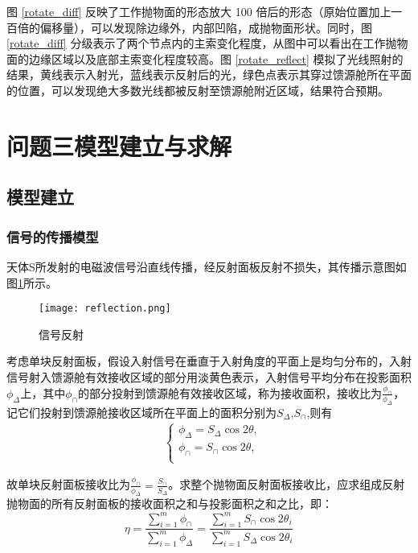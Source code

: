 \documentclass[withoutpreface,bwprint,fontset=macnew]{cumcmthesis} %
\begin{document}
		图 \ref{rotate_diff} 反映了工作抛物面的形态放大 100 倍后的形态（原始位置加上一百倍的偏移量），可以发现除边缘外，内部凹陷，成抛物面形状。同时，图 \ref{rotate_diff} 分级表示了两个节点内的主索变化程度，从图中可以看出在工作抛物面的边缘区域以及底部主索变化程度较高。图 \ref{rotate_reflect} 模拟了光线照射的结果，黄线表示入射光，蓝线表示反射后的光，绿色点表示其穿过馈源舱所在平面的位置，可以发现绝大多数光线都被反射至馈源舱附近区域，结果符合预期。
		
		
	\section {问题三模型建立与求解}
	\subsection {模型建立}
	\subsubsection {信号的传播模型}
		天体S所发射的电磁波信号沿直线传播，经反射面板反射不损失，其传播示意图如图\ref {fig:reflection}所示。
		\begin{figure}[!h]
			\centering
			\texttt{[image: reflection.png]} %
			\caption{信号反射}
			\label{fig:reflection}
		\end{figure}
		考虑单块反射面板，假设入射信号在垂直于入射角度的平面上是均匀分布的，入射信号射入馈源舱有效接收区域的部分用淡黄色表示，入射信号平均分布在投影面积$\phi_\Delta$上，其中$\phi_\cap$的部分投射到馈源舱有效接收区域，称为接收面积，接收比为$\frac{\phi_\cap}{\phi_\Delta}$，记它们投射到馈源舱接收区域所在平面上的面积分别为$S_\Delta$,$S_\cap$,则有
		\begin{align}
			&\begin{cases}
				\phi_\Delta = S_\Delta\cos 2 \theta,\\
				\phi_\cap = S_\cap\cos 2 \theta,\\
			\end{cases}
		\end{align}
	
	
		故单块反射面板接收比为$\frac{\phi_\cap}{\phi_\Delta} = \frac{S_\cap}{S_\Delta}$。求整个抛物面反射面板接收比，应求组成反射抛物面的所有反射面板的接收面积之和与投影面积之和之比，即：
		\begin{equation}
			\eta = \frac{\sum_{i=1}^{m}\phi_\cap}{\sum_{i=1}^{m}\phi_\Delta} = \frac{\sum_{i=1}^{m}S_\cap \cos 2 \theta_i}{\sum_{i=1}^{m}S_\Delta \cos 2 \theta_i}
			\label{eq:receive_rate}
		\end{equation}
	
\end{document}
